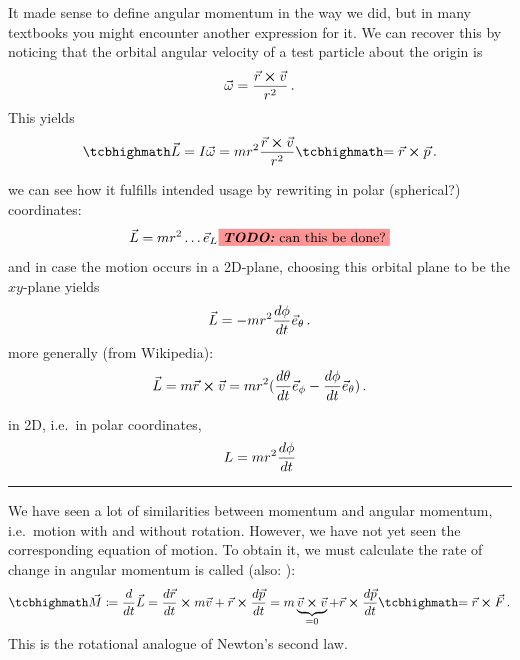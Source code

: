 \documentclass[../class_mech_main.tex]{subfiles}
\begin{document}
It made sense to define angular momentum in the way we did, but in many textbooks you might encounter another expression for it. We can recover this by noticing that the orbital angular velocity of a test particle about the origin is
\begin{equation}
	\vec{\omega} = \frac{\vec{r} \cross \vec{v}}{r^2} \, .
\end{equation}
This yields
\begin{equation}
    \eqbox{\vec{L}} = I \vec{\omega} = m r^2 \frac{\vec{r} \cross \vec{v}}{r^2} \eqbox{= \vec{r} \cross \vec{p}} \, .
\end{equation}



we can see how it fulfills intended usage by rewriting in polar (spherical?) coordinates:
\begin{equation}
    \vec{L} = m r^2 \dots \vec{e}_L \todo{can this be done?}
\end{equation}
and in case the motion occurs in a 2D-plane, choosing this orbital plane to be the $xy$-plane yields
\begin{equation}
    \vec{L} = - m r^2 \dv{\phi}{t} \vec{e}_\theta
	\, .
\end{equation}
more generally (from Wikipedia):
\begin{equation}
	\vec{L} = m \vec{r} \cross \vec{v} = m r^2 (\dv{\theta}{t} \vec{e}_\phi - \dv{\phi}{t} \vec{e}_\theta)
	\, .
\end{equation}

in 2D, i.e.~in polar coordinates,
\begin{equation}
	L = m r^2 \dv{\phi}{t}
\end{equation}


\hrule


We have seen a lot of similarities between momentum and angular momentum, i.e.~motion with and without rotation. However, we have not yet seen the corresponding equation of motion. To obtain it, we must calculate the rate of change in angular momentum is called  (also: ):
\begin{equation}
    \eqbox{\vec{M}} \coloneqq \dv{t} \vec{L} = \dv{\vec{r}}{t} \cross m \vec{v} + \vec{r} \cross \dv{\vec{p}}{t} = m \underbrace{\vec{v} \cross \vec{v}}_{= 0} + \vec{r} \cross \dv{\vec{p}}{t} \eqbox{= \vec{r} \cross \vec{F}} \, .
\end{equation}
This is the rotational analogue of Newton's second law.
\end{document}

